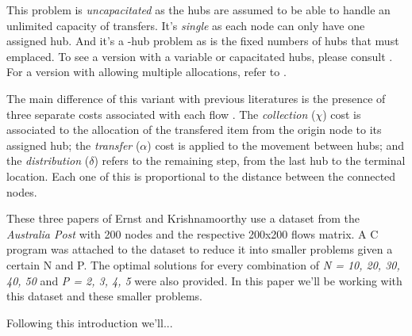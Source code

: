 This problem is \emph{uncapacitated} as the hubs are assumed to be able to handle an unlimited
capacity of transfers. It's \emph{single} as each node can only have one assigned hub. And
it's a \ip-hub problem as \ip is the fixed numbers of hubs that must emplaced. To see a version
with a variable \ip or capacitated hubs, please consult \cite{Ernst1999}. For a version with 
allowing multiple allocations, refer to \cite{Ernst1998}.

The main difference of this variant with previous literatures is the presence of three separate
costs associated with each flow \wij. The \emph{collection} ($\chi$) cost is associated to the allocation 
of the transfered item from the origin node to its assigned hub; the \emph{transfer} ($\alpha$) cost is 
applied to the movement between hubs; and the \emph{distribution} ($\delta$) refers to the remaining step, 
from the last hub to the terminal location. Each one of this is proportional to the distance between 
the connected nodes.

These three papers of Ernst and Krishnamoorthy use a dataset from the \emph{Australia Post} with 200
nodes and the respective 200x200 flows matrix. A C program was attached to the dataset to reduce
it into smaller problems given a certain N and P. The optimal solutions for every combination of 
\emph{N = {10, 20, 30, 40, 50}} and \emph{P = {2, 3, 4, 5}} were also provided. In this paper we'll
be working with this dataset and these smaller problems.

Following this introduction we'll... 



